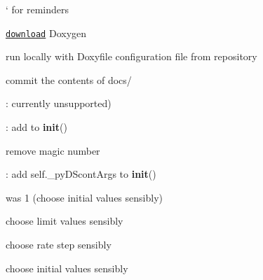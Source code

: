 
\begin{DoxyRefList}
\item[\label{todo__todo000055}%
\Hypertarget{todo__todo000055}%
Page \hyperlink{md__r_e_a_d_m_e}{Mu\+MoT} ]` for reminders
\begin{DoxyItemize}
\item \href{http://www.stack.nl/~dimitri/doxygen/download.html}{\tt download} Doxygen
\item run locally with {\ttfamily Doxyfile} configuration file from repository
\item commit the contents of {\ttfamily docs/} 
\end{DoxyItemize}
\item[\label{todo__todo000035}%
\Hypertarget{todo__todo000035}%
Global \hyperlink{class_mu_mo_t_1_1_mu_mo_tbifurcation_view_a17d5bd0e623faea6f50fc3b7f01d0d38}{Mu\+Mo\+Tbifurcation\+View.\+\_\+bifurcation\+Parameter} ]\+: currently unsupported)  
\item[\label{todo__todo000047}%
\Hypertarget{todo__todo000047}%
Global \hyperlink{class_mu_mo_t_1_1_mu_mo_tbifurcation_view_a797e92fe19ce2636a49bf1400a69fc49}{Mu\+Mo\+Tbifurcation\+View.\+\_\+py\+D\+Scont} ]\+: add to {\bfseries init}() 

remove magic number  
\item[\label{todo__todo000036}%
\Hypertarget{todo__todo000036}%
Global \hyperlink{class_mu_mo_t_1_1_mu_mo_tbifurcation_view_aa56e2cffc879be68fdec55f29334415c}{Mu\+Mo\+Tbifurcation\+View.\+\_\+py\+D\+Scont\+Args} ]\+: add self.\+\_\+py\+D\+Scont\+Args to {\bfseries init}()  
\item[\label{todo__todo000040}%
\Hypertarget{todo__todo000040}%
Global \hyperlink{class_mu_mo_t_1_1_mu_mo_tbifurcation_view_a9e9a430da6d323cc4411c070e0c7eee5}{Mu\+Mo\+Tbifurcation\+View.\+\_\+py\+D\+Smodel} ]was 1 (choose initial values sensibly) 

choose limit values sensibly 

choose rate step sensibly 

choose initial values sensibly 


\end{DoxyRefList}
